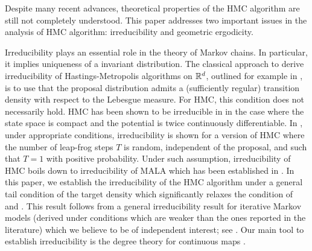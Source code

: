 

Despite many recent advances, theoretical properties of the HMC algorithm are still not completely
understood. This paper addresses two important issues in the analysis of HMC algorithm: irreducibility and geometric ergodicity.

Irreducibility  plays
an essential role in the theory of Markov chains. In particular, it implies uniqueness of a
invariant distribution. The classical approach to derive
irreducibility of Hastings-Metropolis algorithms on $\mathbb{R}^d$, outlined for example in \cite{mengersen:tweedie:1996}
\cite{roberts:tweedie:1996:biometrika}, is to use that the proposal
distribution admits a (sufficiently regular) transition density with respect to the Lebesgue
measure. %
For HMC, this condition does not necessarily hold. HMC has been shown
to be irreducible in \cite{cances:legoll:stoltz} in the case where the
state space is compact and the potential is twice continuously
differentiable. In \cite{livingstone:betancourt:byrne:girolami:2016},
under appropriate conditions, irreducibility is shown for a version
of HMC where the number of leap-frog steps $T$ is random, independent
of the proposal, and such that $T=1$ with positive probability.  Under such assumption, irreducibility of HMC boils down to irreducibility of MALA which has been established in
\cite{roberts:tweedie:1996}.  In this paper, we establish the
irreducibility of the HMC algorithm under a general tail condition of
the target density which significantly relaxes the condition of
\cite{cances:legoll:stoltz} and
\cite{livingstone:betancourt:byrne:girolami:2016}.  This result
follows from a general irreducibility result for iterative Markov
models (derived under conditions which are weaker than the ones
reported in the literature) which we believe to be of independent
interest; see .  Our main tool to establish
irreducibility is the degree theory for continuous maps \cite{outerelo:ruiz:2009}.


